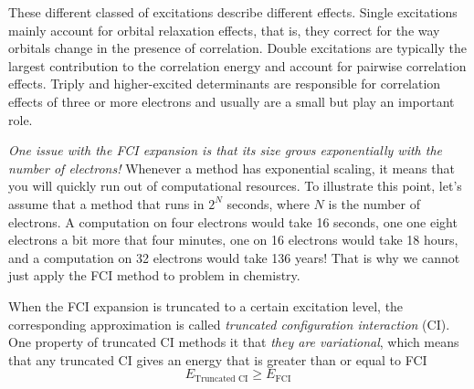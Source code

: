 \documentclass[../Main/chem371-notes.tex]{subfiles}
\begin{document}

These different classed of excitations describe different effects.
Single excitations mainly account for orbital relaxation effects, that is, they correct for the way orbitals change in the presence of correlation.
Double excitations are typically the largest contribution to the correlation energy and account for pairwise correlation effects.
Triply and higher-excited determinants are responsible for correlation effects of three or more electrons and usually are a small but play an important role.


\emph{One issue with the FCI expansion is that its size grows exponentially with the number of electrons!}
Whenever a method has exponential scaling, it means that you will quickly run out of computational resources.
To illustrate this point, let's assume that a method that runs in $2^N$ seconds, where $N$ is the number of electrons.
A computation on four electrons would take 16 seconds, one one eight electrons a bit more that four minutes, one on 16 electrons would take 18 hours, and a computation on 32 electrons would take 136 years!
That is why we cannot just apply the FCI method to problem in chemistry.


When the FCI expansion is truncated to a certain excitation level, the corresponding approximation is called \emph{truncated configuration interaction} (CI).
One property of truncated CI methods it that \emph{they are variational}, which means that any truncated CI gives an energy that is greater than or equal to FCI
\begin{equation}
E_\text{Truncated CI} \geq E_\text{FCI}
\end{equation}
\end{document}
